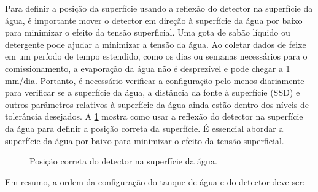 \documentclass[11pt,a4paper]{article}
\begin{document}
	Para definir a posição da superfície usando a reflexão do detector na superfície da água, é importante mover o detector em direção à superfície da água por baixo para minimizar o efeito da tensão superficial. Uma gota de sabão líquido ou detergente pode ajudar a minimizar a tensão da água. Ao coletar dados de feixe em um período de tempo estendido, como os dias ou semanas necessários para o comissionamento, a evaporação da água não é desprezível e pode chegar a 1 mm/dia. Portanto, é necessário verificar a configuração pelo menos diariamente para verificar se a superfície da água, a distância da fonte à superfície (SSD) e outros parâmetros relativos à superfície da água ainda estão dentro dos níveis de tolerância desejados. A \ref{fig:posicaoDetector} mostra como usar a reflexão do detector na superfície da água para definir a posição correta da superfície. É essencial abordar a superfície da água por baixo para minimizar o efeito da tensão superficial.

	\begin{figure}[h]
		\centering
		\caption{Posição correta do detector na superfície da água.}
		\label{fig:posicaoDetector}
	\end{figure}

	Em resumo, a ordem da configuração do tanque de água e do detector deve ser:
\end{document}

